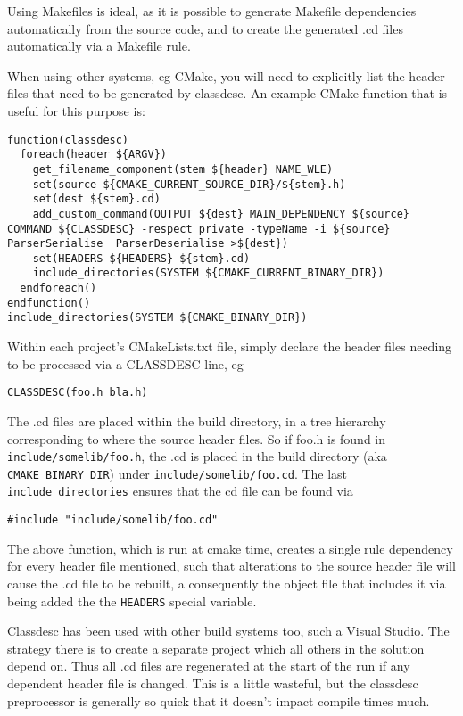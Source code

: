 Using Makefiles is ideal, as it is possible to generate Makefile
dependencies automatically from the source code, and to create the
generated .cd files automatically via a Makefile rule.

When using other systems, eg CMake, you will need to explicitly list
the header files that need to be generated by classdesc. An example
CMake function that is useful for this purpose is:

\begin{verbatim}
function(classdesc)
  foreach(header ${ARGV})
    get_filename_component(stem ${header} NAME_WLE)
    set(source ${CMAKE_CURRENT_SOURCE_DIR}/${stem}.h)
    set(dest ${stem}.cd)
    add_custom_command(OUTPUT ${dest} MAIN_DEPENDENCY ${source} COMMAND ${CLASSDESC} -respect_private -typeName -i ${source} ParserSerialise  ParserDeserialise >${dest})
    set(HEADERS ${HEADERS} ${stem}.cd)
    include_directories(SYSTEM ${CMAKE_CURRENT_BINARY_DIR})
  endforeach()
endfunction()    
include_directories(SYSTEM ${CMAKE_BINARY_DIR})
\end{verbatim}

Within each project's CMakeLists.txt file, simply declare the header
files needing to be processed via a CLASSDESC line, eg
\begin{verbatim}
CLASSDESC(foo.h bla.h)
\end{verbatim}

The .cd files are placed within the build directory, in a tree
hierarchy corresponding to where the source header files. So if foo.h
is found in \verb+include/somelib/foo.h+, the .cd is placed in the build
directory (aka \verb+CMAKE_BINARY_DIR+)  under
\verb+include/somelib/foo.cd+. The last \verb+include_directories+
ensures that the cd file can be found via
\begin{verbatim}
#include "include/somelib/foo.cd"
\end{verbatim}

The above function, which is run at cmake time, creates a single rule
dependency for every header file mentioned, such that alterations to
the source header file will cause the .cd file to be rebuilt, a
consequently the object file that includes it via being added the the
\verb+HEADERS+ special variable.

Classdesc has been used with other build systems too, such a Visual Studio.
The strategy there is to create a separate project which all others
in the solution depend on. Thus all .cd files are regenerated at the start
of the run if any dependent header file is changed. This is a little
wasteful, but the classdesc preprocessor is generally so quick that it
doesn't impact compile times much. 

